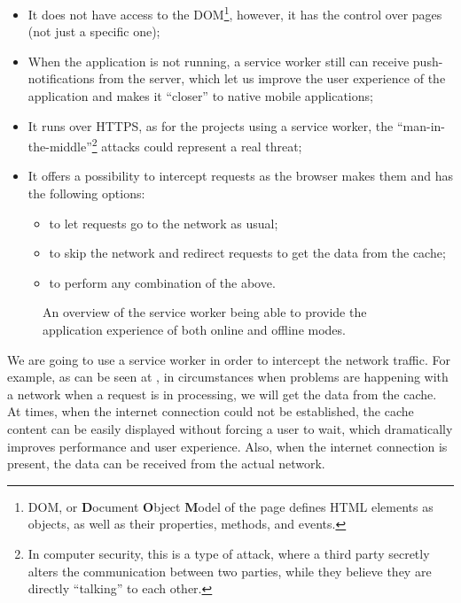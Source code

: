 \begin{itemize}
\item{It does not have access to the DOM\footnote{DOM, or \textbf{D}ocument \textbf{O}bject \textbf{M}odel of the page defines HTML elements as objects, as well as their properties, methods, and events.}, however, it has the control over pages (not just a specific one);}
\item{When the application is not running, a service worker still can receive push-notifications from the server\cite{32}, which let us improve the user experience of the application and makes it ``closer'' to native mobile applications;}

\item{It runs over HTTPS, as for the projects using a service worker, the ``man-in-the-middle''\footnote{In computer security, this is a type of attack, where a third party secretly alters the communication between two parties, while they believe they are directly ``talking'' to each other\cite{33}.} attacks could represent a real threat;}
\item{It offers a possibility to intercept requests as the browser makes them and has the following options:}
\begin{itemize}
\item{to let requests go to the network as usual;}
\item{to skip the network and redirect requests to get the data from the cache;}
\item{to perform any combination of the above.}
\end{itemize}
\end{itemize}

\begin{figure}[!htb]
    \begin{center}
    \def\svgwidth{0.7\linewidth}
    
    \caption {An overview of the service worker being able to provide the application experience of both online and offline modes.}
    \label{fig:sw_interact}
\end{center}
\end{figure}

We are going to use a service worker in order to intercept the network traffic. For example, as can be seen at , in circumstances when problems are happening with a network when a request is in processing, we will get the data from the cache. At times, when the internet connection could not be established, the cache content can be easily displayed without forcing a user to wait, which dramatically improves performance and user experience. Also, when the internet connection is present, the data can be received from the actual network. 

